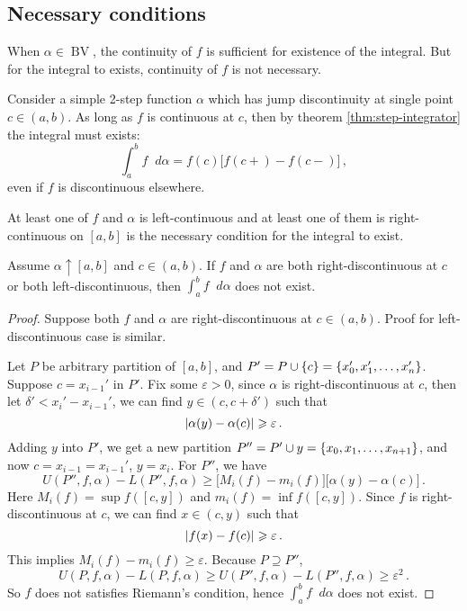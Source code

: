 \documentclass{article}
\DeclarePairedDelimiter\set{\lbrace}{\rbrace}
\DeclarePairedDelimiter\abs{\lvert}{\rvert}
\newcommand{\finer}{\supseteq}
\newcommand{\dd}{\mathop{}\!d}
\newcommand{\increasing}{\uparrow}
\DeclareMathOperator{\BV}{BV}
\begin{document}
\subsection{Necessary conditions}
When $ \alpha \in \BV $, the continuity of $ f $ is sufficient for existence of the integral. But for the integral to exists, continuity of $ f $ is not necessary.

\begin{example}
    Consider a simple 2-step function $ \alpha $ which has jump discontinuity at single point $ c \in (a, b) $. As long as $ f $ is continuous at $ c $, then by theorem \ref{thm:step-integrator} the integral must exists:
    \[ 
        \int_a^b f \dd \alpha = f(c) \big[ f(c+) - f(c-) \big] \,,
    \]
    even if $ f $ is discontinuous elsewhere.
\end{example}

At least one of $ f $ and $ \alpha $ is left-continuous and at least one of them is right-continuous on $ [a, b] $ is the necessary condition for the integral to exist.

\begin{theorem}
    Assume $ \alpha \increasing [a, b] $ and $ c \in (a, b) $. If $ f $ and $ \alpha $ are both right-discontinuous at $ c $ or both left-discontinuous, then $ \int_a^b f \dd \alpha $ does not exist.
\end{theorem}

\begin{proof} 
    Suppose both $ f $ and $ \alpha $ are right-discontinuous at $ c \in (a, b) $. Proof for left-discontinuous case is similar.
    
    Let $ P $ be arbitrary partition of $ [a, b] $, and $ P' = P \cup \set{c} = \set{x_0', x_1', \dots, x_n'} $. Suppose $ c = x_{i-1}' $ in $ P' $. Fix some $ \varepsilon > 0 $, since $ \alpha $ is right-discontinuous at $ c $, then let $ \delta' < x_i' - x_{i - 1}' $, we can find $ y \in (c, c + \delta') $ such that
    \[ 
        \abs{ \alpha(y) - \alpha(c) } \geqslant \varepsilon \,.
    \]
    Adding $ y $ into $ P' $, we get a new partition $ P'' = P' \cup {y} = \set{x_0, x_1, \dots, x_{n+1}} $, and now $ c = x_{i-1} = x_{i-1}' $, $ y = x_i $. For $ P'' $, we have
    \[ 
        U(P'', f, \alpha) - L(P'', f, \alpha) \geqslant \big[ M_i(f) - m_i(f) \big] \big[ \alpha(y) - \alpha(c) \big] \,.
    \]
    Here $ M_i(f) = \sup f([c, y]) $ and $ m_i(f) = \inf f([c, y]) $. Since $ f $ is right-discontinuous at $ c $, we can find $ x \in (c, y) $ such that
    \[ 
        \abs{ f(x) - f(c) } \geqslant \varepsilon \,.
    \]
    This implies $ M_i(f) - m_i(f) \geqslant \varepsilon $. Because $ P \finer P'' $,
    \[ 
        U(P, f, \alpha) - L(P, f, \alpha) \geqslant U(P'', f, \alpha) - L(P'', f, \alpha) \geqslant \varepsilon^2 \,.
    \]
    So $ f $ does not satisfies Riemann's condition, hence $ \int_a^b f \dd \alpha $ does not exist.
\end{proof}
\end{document}
